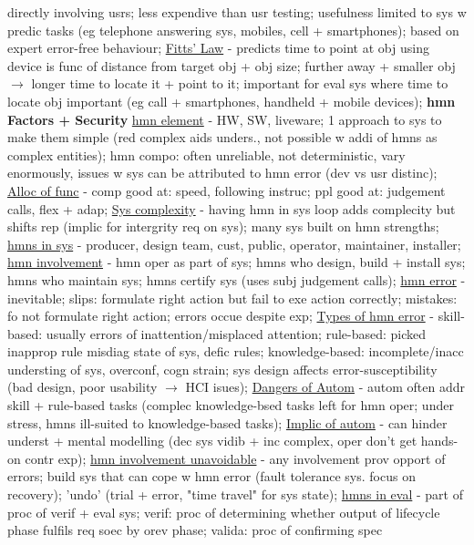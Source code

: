 \documentclass[a4paper]{article}
\begin{document}
\begin{multicols}{3}
        directly involving usrs; less expendive than usr testing; usefulness limited to sys w predic tasks (eg telephone answering sys, mobiles, cell + smartphones); based on expert error-free behaviour; \underline{Fitts' Law} -
        predicts time to point at obj using device is func of distance from target obj + obj size; further away + smaller obj $\to$ longer time to locate it + point to it; important for eval sys where time to locate obj important
        (eg call + smartphones, handheld + mobile devices); \newline \textbf{hmn Factors + Security} \underline{hmn element} - HW, SW, liveware; 1 approach to sys to make them simple (red complex aids unders., not
        possible w addi of hmns as complex entities); hmn compo: often unreliable, not deterministic, vary enormously, issues w sys can be attributed to hmn error (dev vs usr distinc); \underline{Alloc of func} - comp good at:
        speed, following instruc; ppl good at: judgement calls, flex + adap; \underline{Sys complexity} - having hmn in sys loop adds complecity but shifts rep (implic for intergrity req on sys); many sys built on hmn strengths;
        \underline{hmns in sys} - producer, design team, cust, public, operator, maintainer, installer; \underline{hmn involvement} - hmn oper as part of sys; hmns who design, build + install sys; hmns who
        maintain sys; hmns certify sys (uses subj judgement calls); \underline{hmn error} - inevitable; slips: formulate right action but fail to exe action correctly; mistakes: fo not formulate right action; errors
        occue despite exp; \underline{Types of hmn error} - skill-based: usually errors of inattention/misplaced attention; rule-based: picked inapprop rule misdiag state of sys, defic rules; knowledge-based: incomplete/inacc
        understing of sys, overconf, cogn strain; sys design affects error-susceptibility (bad design, poor usability $\to$ HCI isues); \underline{Dangers of Autom} - autom often addr skill + rule-based tasks (complec
        knowledge-bsed tasks left for hmn oper; under stress, hmns ill-suited to knowledge-based tasks); \underline{Implic of autom} - can hinder underst + mental modelling (dec sys vidib + inc complex, oper don't get
        hands-on contr exp); \underline{hmn involvement unavoidable} - any involvement prov opport of errors; build sys that can cope w hmn error (fault tolerance sys. focus on recovery); 'undo' (trial + error, "time
        travel" for sys state); \underline{hmns in eval} - part of proc of verif + eval sys; verif: proc of determining whether output of lifecycle phase fulfils req soec by orev phase; valida: proc of confirming spec

\end{multicols}
\end{document}
